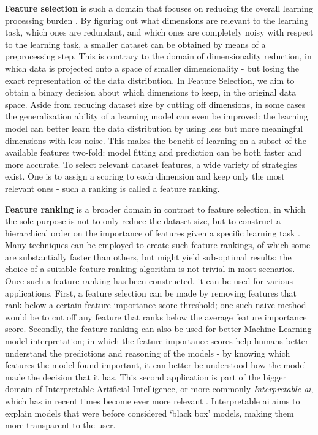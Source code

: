 \documentclass[../main.tex]{subfiles}
\begin{document}
\textbf{Feature selection} is such a domain that focuses on reducing the overall learning processing burden \citep{guyon_introduction_2003}. By figuring out what dimensions are relevant to the learning task, which ones are redundant, and which ones are completely noisy with respect to the learning task, a smaller dataset can be obtained by means of a preprocessing step. This is contrary to the domain of dimensionality reduction, in which data is projected onto a space of smaller dimensionality - but losing the exact representation of the data distribution. In Feature Selection, we aim to obtain a binary decision about which dimensions to keep, in the original data space. Aside from reducing dataset size by cutting off dimensions, in some cases the generalization ability of a learning model can even be improved: the learning model can better learn the data distribution by using less but more meaningful dimensions with less noise. This makes the benefit of learning on a subset of the available features two-fold: model fitting and prediction can be both faster and more accurate. To select relevant dataset features, a wide variety of strategies exist. One is to assign a scoring to each dimension and keep only the most relevant ones - such a ranking is called a feature ranking.



\textbf{Feature ranking} is a broader domain in contrast to feature selection, in which the sole purpose is not to only reduce the dataset size, but to construct a hierarchical order on the importance of features given a specific learning task \citep{duch_comparison_2004}. Many techniques can be employed to create such feature rankings, of which some are substantially faster than others, but might yield sub-optimal results: the choice of a suitable feature ranking algorithm is not trivial in most scenarios. Once such a feature ranking has been constructed, it can be used for various applications. First, a feature selection can be made by removing features that rank below a certain feature importance score threshold; one such naive method would be to cut off any feature that ranks below the average feature importance score. Secondly, the feature ranking can also be used for better Machine Learning model interpretation; in which the feature importance scores help humans better understand the predictions and reasoning of the models - by knowing which features the model found important, it can better be understood how the model made the decision that it has. This second application is part of the bigger domain of Interpretable Artificial Intelligence, or more commonly \textit{Interpretable \gls{ai}}, which has in recent times become ever more relevant \citep{ghosh_interpretable_2020}. Interpretable \gls{ai} aims to explain models that were before considered `black box' models, making them more transparent to the user.
\end{document}
